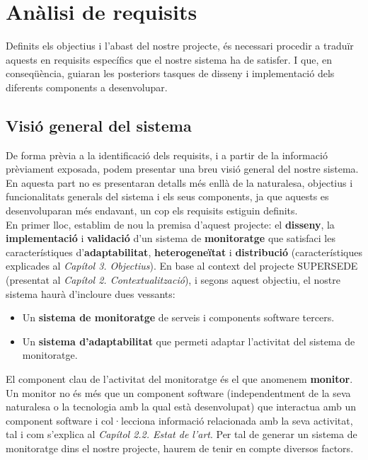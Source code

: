 
\chapter{Anàlisi de requisits} %

\label{AnalisiRequisits} %

Definits els objectius i l'abast del nostre projecte, és necessari procedir a traduïr aquests en requisits específics que el nostre sistema ha de satisfer. I que, en conseqüència, guiaran les posteriors tasques de disseny i implementació dels diferents components a desenvolupar.

\section{Visió general del sistema}

De forma prèvia a la identificació dels requisits, i a partir de la informació prèviament exposada, podem presentar una breu visió general del nostre sistema. En aquesta part no es presentaran detalls més enllà de la naturalesa, objectius i funcionalitats generals del sistema i els seus components, ja que aquests es desenvoluparan més endavant, un cop els requisits estiguin definits.\\

En primer lloc, establim de nou la premisa d'aquest projecte: el \textbf{disseny}, la \textbf{implementació} i \textbf{validació} d'un sistema de \textbf{monitoratge} que satisfaci les característiques d'\textbf{adaptabilitat}, \textbf{heterogeneïtat} i \textbf{distribució} (característiques explicades al \textit{Capítol 3. Objectius}). En base al context del projecte SUPERSEDE (presentat al \textit{Capítol 2. Contextualització}), i segons aquest objectiu, el nostre sistema haurà d'incloure dues vessants:

\begin{itemize}
\item Un \textbf{sistema de monitoratge} de serveis i components software tercers.
\item Un \textbf{sistema d'adaptabilitat} que permeti adaptar l'activitat del sistema de monitoratge.
\end{itemize}

El component clau de l'activitat del monitoratge és el que anomenem \textbf{monitor}. Un monitor no és més que un component software (independentment de la seva naturalesa o la tecnologia amb la qual està desenvolupat) que interactua amb un component software i col·lecciona informació relacionada amb la seva activitat, tal i com s'explica al \textit{Capítol 2.2. Estat de l'art}. Per tal de generar un sistema de monitoratge dins el nostre projecte, haurem de tenir en compte diversos factors.\\

